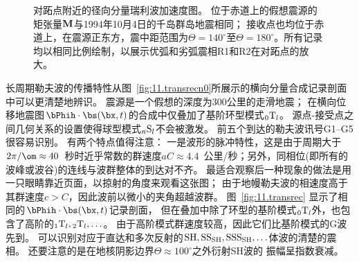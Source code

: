 \begin{figure}
\begin{center}
\end{center}
\caption[Rayleigh antipode]{
\label{fig:11.16}
对跖点附近的径向分量瑞利波加速度图。
位于赤道上的假想震源的矩张量${\bf M}$与1994年10月4日的千岛群岛地震相同；
接收点也均位于赤道上，在震源正东方，震中距范围为$\Theta=140^{\circ}$至$\Theta=180^{\circ}$。所有记录均以相同比例绘制，以展示优弧和劣弧震相R1和R2在对跖点的放大。}
\end{figure}

长周期勒夫波的传播特性从图~\ref{fig:11.transrecn0}所展示的横向分量合成记录剖面中可以更清楚地辨识。
震源是一个假想的深度为300公里的走滑地震；
在横向位移地震图$\bPhih\cdot\bs(\bx,t)$的合成中仅叠加了基阶环型模式${}_0{\rm T}_l$。
源点-接受点之间几何关系的设置使得球型模式${}_n{\rm S}_l$不会被激发。
前五个到达的勒夫波讯号G1--G5很容易识别。
有两个特点值得注意：
一是波形的脉冲特性，这是由于周期大于$2\pi/\om\approx 40$~秒时近乎常数的群速度$aC\approx 4.4$~公里/秒；另外，同相位(即所有的波峰或波谷)的连线与波群整体的到达对不齐。
最适合观察后一种现象的做法是用一只眼睛靠近页面，以掠射的角度来观看这张图；
由于地幔勒夫波的相速度高于其群速度$c>C$，因此波前以微小的夹角超越波群。
图~\ref{fig:11.transrec} 显示了相同的$\bPhih\cdot\bs(\bx,t)$记录剖面，
但在叠加中除了环型的基阶模式${}_0{\rm T}_l$外，也包含了高阶的${}_1{\rm T}_l,{}_2{\rm T}_l,\ldots$。
由于高阶模式群速度较高，因此它们比基阶模式的G波先到。
可以识别对应于直达和多次反射的${\rm SH},{\rm SS}_{\rm SH},{\rm SSS}_{\rm SH},\ldots$体波的清楚的震相。
还要注意的是在地核阴影边界$\Theta\approx 100^{\circ}$之外衍射SH波的
振幅呈指数衰减。

